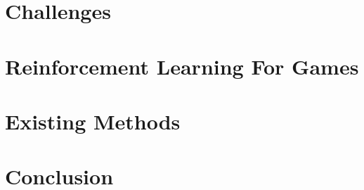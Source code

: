 \section{Challenges}

\section{Reinforcement Learning For Games}


\section{Existing Methods}

\section{Conclusion}
